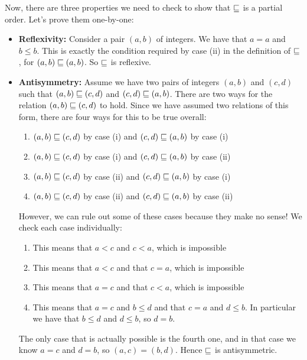 Now, there are three properties we need to check to show that $\sqsubseteq$ is a partial order. Let's prove them one-by-one: 
\begin{itemize}
\item 
	\textbf{Reflexivity:}
	Consider a pair $(a, b)$ of integers. We have that $a = a$ and $b \leq b$. This is exactly the condition required by case (ii) in the definition of $\sqsubseteq$, for $(a, b) \sqsubseteq (a, b)$. So $\sqsubseteq$ is reflexive.
	
\item 
	\textbf{Antisymmetry:}
	Assume we have two pairs of integers $(a, b)$ and $(c, d)$ such that $(a, b) \sqsubseteq (c, d)$ and $(c, d)\sqsubseteq (a, b)$. There are two ways for the relation $(a, b) \sqsubseteq (c, d)$ to hold. Since we have assumed two relations of this form, there are four  ways for this to be true overall:
	\begin{enumerate}
		\item $(a, b) \sqsubseteq (c, d)$ by case (i) and $(c, d) \sqsubseteq (a, b)$ by case (i)
		\item $(a, b) \sqsubseteq (c, d)$ by case (i) and $(c, d) \sqsubseteq (a, b)$ by case (ii)
		\item $(a, b) \sqsubseteq (c, d)$ by case (ii) and $(c, d) \sqsubseteq (a, b)$ by case (i)
		\item $(a, b) \sqsubseteq (c, d)$ by case (ii) and $(c, d) \sqsubseteq (a, b)$ by case (ii)
	\end{enumerate}
However, we can rule out some of these cases because they make no sense!
We check each case individually:
	\begin{enumerate}
		\item This means that $a < c$ and $c < a$, which is impossible
		\item This means that $a < c$ and that $c = a$, which is impossible
		\item This means that $a = c$ and that $c < a$, which is impossible
		\item This means that $a = c$ and $b \leq d$ and that $c = a$ and $d \leq b$. In particular we have that $b \leq d$ and $d \leq b$, so $d = b$.
	\end{enumerate}
The only case that is actually possible is the fourth one, and in that case we know $a = c$ and $d = b$, so $(a, c) = (b, d)$. Hence $\sqsubseteq$ is antisymmetric.


\end{itemize}
